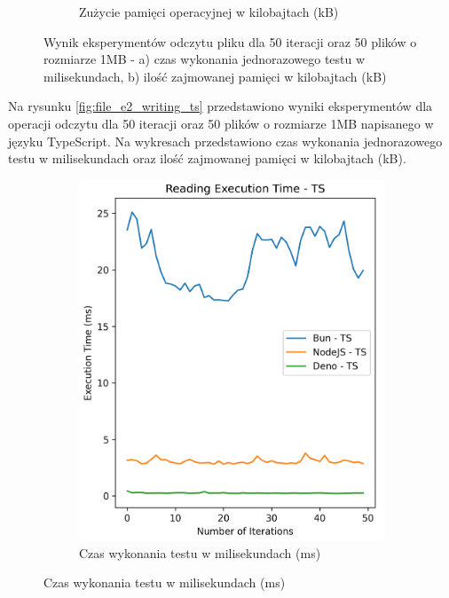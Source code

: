 \begin{figure}[H]
\begin{subfigure}[b]{0.42\textwidth}
    \caption{Zużycie pamięci operacyjnej w kilobajtach (kB)}
    \label{fig:file_e2_reading_ts_memory}
  \end{subfigure}
  \caption{Wynik eksperymentów odczytu pliku dla 50 iteracji oraz 50 plików o rozmiarze 1MB - a) czas wykonania jednorazowego testu w milisekundach, b) ilość zajmowanej pamięci w kilobajtach (kB)}
  \label{fig:file_e2_reading_ts}
\end{figure}

Na rysunku \ref{fig:file_e2_writing_ts} przedstawiono wyniki eksperymentów dla operacji odczytu dla 50 iteracji oraz 50 plików o rozmiarze 1MB napisanego w języku TypeScript. Na wykresach przedstawiono czas wykonania jednorazowego testu w milisekundach oraz ilość zajmowanej pamięci w kilobajtach (kB).

\begin{figure}[H]
  \centering
  \begin{subfigure}[b]{0.42\textwidth}
    \centering
    \includegraphics[width=\textwidth]{Figures/files/files_writing_50_2000_50_ts_time.png}
    \caption{Czas wykonania testu w milisekundach (ms)}
    \label{fig:file_e2_writing_ts_time}

\end{subfigure}
\end{figure}
